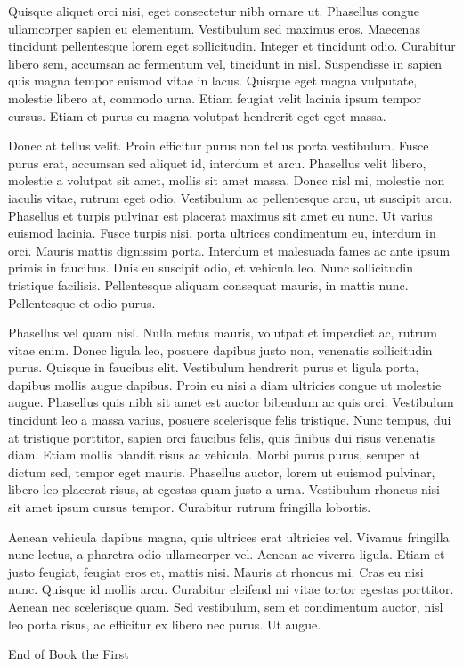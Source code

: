 \documentclass{amsbook}
\begin{document}
Quisque aliquet orci nisi, eget consectetur nibh ornare ut. Phasellus congue ullamcorper sapien eu elementum. Vestibulum sed maximus eros. Maecenas tincidunt pellentesque lorem eget sollicitudin. Integer et tincidunt odio. Curabitur libero sem, accumsan ac fermentum vel, tincidunt in nisl. Suspendisse in sapien quis magna tempor euismod vitae in lacus. Quisque eget magna vulputate, molestie libero at, commodo urna. Etiam feugiat velit lacinia ipsum tempor cursus. Etiam et purus eu magna volutpat hendrerit eget eget massa.

Donec at tellus velit. Proin efficitur purus non tellus porta vestibulum. Fusce purus erat, accumsan sed aliquet id, interdum et arcu. Phasellus velit libero, molestie a volutpat sit amet, mollis sit amet massa. Donec nisl mi, molestie non iaculis vitae, rutrum eget odio. Vestibulum ac pellentesque arcu, ut suscipit arcu. Phasellus et turpis pulvinar est placerat maximus sit amet eu nunc. Ut varius euismod lacinia. Fusce turpis nisi, porta ultrices condimentum eu, interdum in orci. Mauris mattis dignissim porta. Interdum et malesuada fames ac ante ipsum primis in faucibus. Duis eu suscipit odio, et vehicula leo. Nunc sollicitudin tristique facilisis. Pellentesque aliquam consequat mauris, in mattis nunc. Pellentesque et odio purus.

Phasellus vel quam nisl. Nulla metus mauris, volutpat et imperdiet ac, rutrum vitae enim. Donec ligula leo, posuere dapibus justo non, venenatis sollicitudin purus. Quisque in faucibus elit. Vestibulum hendrerit purus et ligula porta, dapibus mollis augue dapibus. Proin eu nisi a diam ultricies congue ut molestie augue. Phasellus quis nibh sit amet est auctor bibendum ac quis orci. Vestibulum tincidunt leo a massa varius, posuere scelerisque felis tristique. Nunc tempus, dui at tristique porttitor, sapien orci faucibus felis, quis finibus dui risus venenatis diam. Etiam mollis blandit risus ac vehicula. Morbi purus purus, semper at dictum sed, tempor eget mauris. Phasellus auctor, lorem ut euismod pulvinar, libero leo placerat risus, at egestas quam justo a urna. Vestibulum rhoncus nisi sit amet ipsum cursus tempor. Curabitur rutrum fringilla lobortis.

Aenean vehicula dapibus magna, quis ultrices erat ultricies vel. Vivamus fringilla nunc lectus, a pharetra odio ullamcorper vel. Aenean ac viverra ligula. Etiam et justo feugiat, feugiat eros et, mattis nisi. Mauris at rhoncus mi. Cras eu nisi nunc. Quisque id mollis arcu. Curabitur eleifend mi vitae tortor egestas porttitor. Aenean nec scelerisque quam. Sed vestibulum, sem et condimentum auctor, nisl leo porta risus, ac efficitur ex libero nec purus. Ut augue.


\bigskip
\bigskip
\begin{center}
{\sc End of Book the First}
\end{center}
\end{document}
